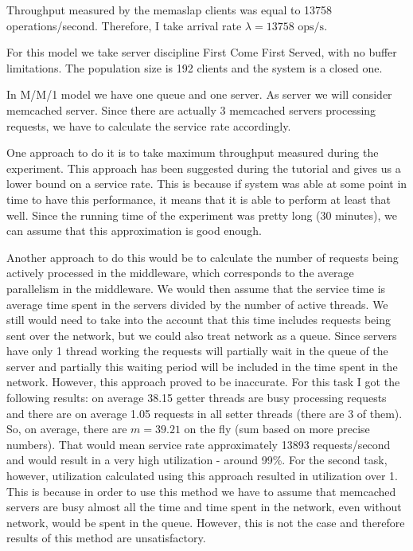 \documentclass[11pt]{article}
\begin{document}
Throughput measured by the memaslap clients was equal to 13758 operations/second. Therefore, I take arrival rate $\lambda = 13758 \textrm{ ops/s}$.

For this model we take server discipline First Come First Served, with no buffer limitations. The population size is 192 clients and the system is a closed one.

In M/M/1 model we have one queue and one server. As server we will consider memcached server. Since there are actually 3 memcached servers processing requests, we have to calculate the service rate accordingly.

One approach to do it is to take maximum throughput measured during the experiment. This approach has been suggested during the tutorial and gives us a lower bound on a service rate. This is because if system was able at some point in time to have this performance, it means that it is able to perform at least that well. Since the running time of the experiment was pretty long (30 minutes), we can assume that this approximation is good enough.

Another approach to do this would be to calculate the number of requests being actively processed in the middleware, which corresponds to the average parallelism in the middleware. We would then assume that the service time is average time spent in the servers divided by the number of active threads. We still would need to take into the account that this time includes requests being sent over the network, but we could also treat network as a queue. Since servers have only 1 thread working the requests will partially wait in the queue of the server and partially this waiting period will be included in the time spent in the network. However, this approach proved to be inaccurate. For this task I got the following results: on average 38.15 getter threads are busy processing requests and there are on average 1.05 requests in all setter threads (there are 3 of them). So, on average, there are $m = 39.21$ on the fly (sum based on more precise numbers). That would mean service rate approximately 13893 requests/second and would result in a very high utilization - around 99\%. For the second task, however, utilization calculated using this approach resulted in utilization over 1. This is because in order to use this method we have to assume that memcached servers are busy almost all the time and time spent in the network, even without network, would be spent in the queue. However, this is not the case and therefore results of this method are unsatisfactory. 
\end{document}
